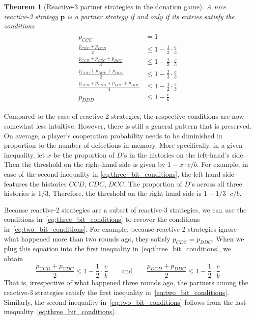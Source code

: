 \documentclass[9pt,twoside,lineno]{pnas-new}
\theoremstyle{plainCl1}
\newtheorem{theorem}{Theorem}
\theoremstyle{plainCl2}
\begin{document}
\begin{theorem}[Reactive-3 partner strategies in the donation game]\label{theorem:reactive_three_partner_strategies}
A nice reactive-3 strategy $\mathbf{p}$ is a partner strategy if and only if its entries satisfy the conditions
\begin{align}\label{eq:three_bit_conditions}
  \begin{split}
  p_{CCC} & = 1 \\
  \frac{p_{CDC} + p_{DCD}}{2} & \leq 1 - \frac{1}{2} \cdot \frac{c}{b} \\
  \frac{p_{CCD} + p_{CDC} + p_{DCC}}{3} & \leq 1 - \frac{1}{3} \cdot \frac{c}{b} \\
  \frac{p_{CDD} + p_{DCD} + p_{DDC}}{3} & \leq 1 - \frac{2}{3} \cdot \frac{c}{b} \\
  \frac{p_{CCD} + p_{CDD} + p_{DCC} + p_{DDC}}{4}  & \leq 1 - \frac{1}{2} \cdot \frac{c}{b}  \\
  p_{DDD} & \leq 1\!-\! \frac{c}{b}
  \end{split}
\end{align}
\end{theorem}

\noindent
Compared to the case of reactive-2 strategies, the respective conditions are now somewhat less intuitive. 
However, there is still a general pattern that is preserved. 
On average, a player's cooperation probability needs to be diminished in proportion to the number of defections in memory. 
More specifically, in a given inequality, let $x$ be the proportion of $D$'s in the histories on the left-hand's side. 
Then the threshold on the right-hand side is given by $1-x\cdot c/b$. 
For example, in case of the second inequality in \eqref{eq:three_bit_conditions}, the left-hand side features the histories $CCD$, $CDC$, $DCC$. 
The proportion of $D$'s across all three histories is $1/3$. 
Therefore, the threshold on the right-hand side is $1-1/3\!\cdot\!c/b$. 

Because reactive-2 strategies are a subset of reactive-3 strategies, we can use the conditions in~\eqref{eq:three_bit_conditions} to recover the conditions in~\eqref{eq:two_bit_conditions}. 
For example, because reactive-2 strategies ignore what happened more than two rounds ago, they satisfy $p_{CDC}\!=\!p_{DDC}$. 
When we plug this equation into the first inequality in~\eqref{eq:three_bit_conditions}, we obtain
\begin{equation}
\frac{ p_{CCD}+p_{CDC} }{2}  \leq 1 - \frac{1}{2} \cdot \frac{c}{b} \qquad \text{and} \qquad \frac{ p_{DCD}+p_{DDC}}{2}  \leq 1 - \frac{1}{2} \cdot \frac{c}{b} 
\end{equation}
That is, irrespective of what happened three rounds ago, the partners among the reactive-3 strategies satisfy the first inequality in~\eqref{eq:two_bit_conditions}. 
Similarly, the second inequality in~\eqref{eq:two_bit_conditions} follows from the last inequality~\eqref{eq:three_bit_conditions}. 
\end{document}
